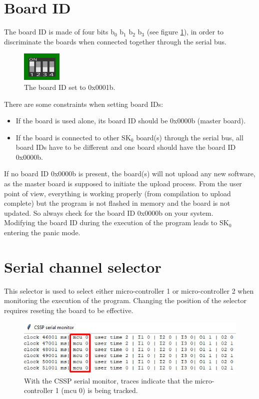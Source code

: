 \section{Board ID}
The board ID is made of four bits b$_0$ b$_1$ b$_2$ b$_3$ (see figure \ref{annexes:SK0-boardid}), in order to discriminate the boards when connected together through the serial bus.
\begin{figure}[h]
\centering\includegraphics[scale=0.668]{Pictures/chapterAnnexes/boardid.png}
\caption{The board ID set to 0x0001b.}
\label{annexes:SK0-boardid}
\end{figure}
There are some constraints when setting board IDs:
\begin{itemize}
    \item If the board is used alone, its board ID should be 0x0000b (master board).
    \item If the board is connected to other SK$_0$ board(s) through the serial bus, all board IDs have to be different and one board should have the board ID 0x0000b.
\end{itemize}
If no board ID 0x0000b is present, the board(s) will not upload any new software, as the master board is supposed to initiate the upload process. From the user point of view, everything is working properly (from compilation to upload complete) but the program is not flashed in memory and the board is not updated. So always check for the board ID 0x0000b on your system. \\
Modifying the board ID during the execution of the program leads to SK$_0$ entering the panic mode.

\section{Serial channel selector}
This selector is used to select either micro-controller 1 or micro-controller 2 when monitoring the execution of the program. Changing the position of the selector requires reseting the board to be effective.
\begin{figure}[h]
\centering\includegraphics[scale=0.668]{Pictures/chapterAnnexes/traces-channel-selector.png}
\caption{With the CSSP serial monitor, traces indicate that the micro-controller 1 (mcu 0) is being tracked.}
\label{annexes:SK0-channel-selector}
\end{figure}

